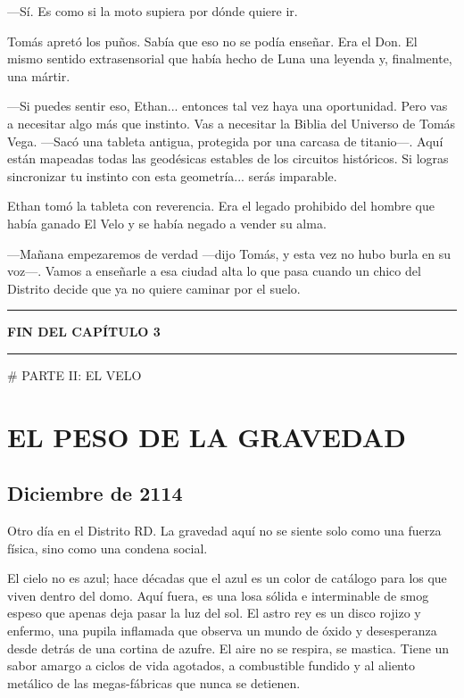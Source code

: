 \documentclass[12pt,a4paper]{book}
\begin{document}
---Sí. Es como si la moto supiera por dónde quiere ir.

Tomás apretó los puños. Sabía que eso no se podía enseñar. Era el Don. El mismo sentido extrasensorial que había hecho de Luna una leyenda y, finalmente, una mártir.

---Si puedes sentir eso, Ethan... entonces tal vez haya una oportunidad. Pero vas a necesitar algo más que instinto. Vas a necesitar la Biblia del Universo de Tomás Vega. ---Sacó una tableta antigua, protegida por una carcasa de titanio---. Aquí están mapeadas todas las geodésicas estables de los circuitos históricos. Si logras sincronizar tu instinto con esta geometría... serás imparable.

Ethan tomó la tableta con reverencia. Era el legado prohibido del hombre que había ganado El Velo y se había negado a vender su alma.

---Mañana empezaremos de verdad ---dijo Tomás, y esta vez no hubo burla en su voz---. Vamos a enseñarle a esa ciudad alta lo que pasa cuando un chico del Distrito decide que ya no quiere caminar por el suelo.

\bigskip
\noindent\rule{\textwidth}{0.4pt}
\bigskip

\textbf{FIN DEL CAPÍTULO 3}


\bigskip
\noindent\rule{\textwidth}{0.4pt}
\bigskip


# PARTE II: EL VELO

\chapter{EL PESO DE LA GRAVEDAD}

\section*{Diciembre de 2114}

Otro día en el Distrito RD. La gravedad aquí no se siente solo como una fuerza física, sino como una condena social.

El cielo no es azul; hace décadas que el azul es un color de catálogo para los que viven dentro del domo. Aquí fuera, es una losa sólida e interminable de smog espeso que apenas deja pasar la luz del sol. El astro rey es un disco rojizo y enfermo, una pupila inflamada que observa un mundo de óxido y desesperanza desde detrás de una cortina de azufre. El aire no se respira, se mastica. Tiene un sabor amargo a ciclos de vida agotados, a combustible fundido y al aliento metálico de las megas-fábricas que nunca se detienen.
\end{document}
